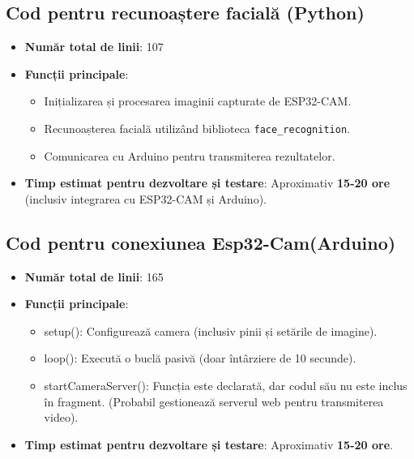 \documentclass[a4paper,12pt]{report}
\begin{document}
\subsection{Cod pentru recunoaștere facială (Python)}
\begin{itemize}
    \item \textbf{Număr total de linii}: 107
    \item \textbf{Funcții principale}:
    \begin{itemize}
        \item Inițializarea și procesarea imaginii capturate de ESP32-CAM.
        \item Recunoașterea facială utilizând biblioteca \texttt{face\_recognition}.
        \item Comunicarea cu Arduino pentru transmiterea rezultatelor.
    \end{itemize}
    \item \textbf{Timp estimat pentru dezvoltare și testare}: Aproximativ \textbf{15-20 ore} (inclusiv integrarea cu ESP32-CAM și Arduino).
\end{itemize}

\subsection{Cod pentru conexiunea Esp32-Cam(Arduino)}
\begin{itemize}
\item \textbf{Număr total de linii}: 165
    \item \textbf{Funcții principale}:
    \begin{itemize}
        \item setup(): Configurează camera (inclusiv pinii și setările de imagine).
        \item loop(): Execută o buclă pasivă (doar întârziere de 10 secunde).
        \item startCameraServer(): Funcția este declarată, dar codul său nu este inclus în fragment. (Probabil gestionează serverul web pentru transmiterea video).
    \end{itemize}
   \item \textbf{Timp estimat pentru dezvoltare și testare}: Aproximativ \textbf{15-20 ore}.
\end{itemize}
\end{document}

